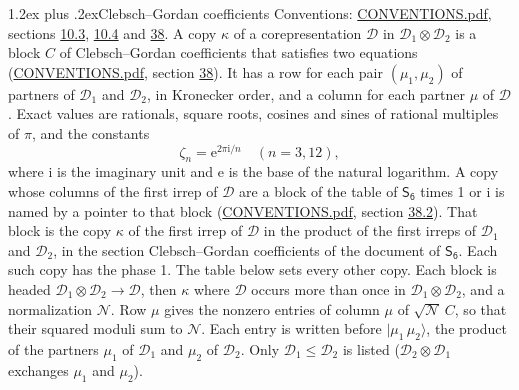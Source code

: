 \documentclass[10pt,a4paper]{article}
\makeatletter
\renewcommand\section{\@startsection{section}{1}{\z@}{-3ex plus -1ex minus -.2ex}%
  {1.2ex plus .2ex}{\normalfont\large\sffamily\bfseries\color{parttitle}}}
\numberwithin{equation}{section}
\newcommand{\grp}[1]{\mathsf{#1}}
\newcommand{\iunit}{\mathrm{i}}
\newcommand{\expe}{\mathrm{e}}
\newcommand{\rootunity}[1]{\zeta_{#1}}
\newcommand{\irrprod}{\otimes}
\newcommand{\mult}{\kappa}
\newcommand{\intx}{\mu}
\newcommand{\cgnorm}{\mathcal{N}}
\newcommand{\prodket}[2]{\lvert {#1}\,{#2}\rangle}
\makeatother
\begin{document}
\section{Clebsch--Gordan coefficients}\label{s:clebsch_gordan}
Conventions: \href{../../CONVENTIONS.pdf}{CONVENTIONS.pdf}, sections \href{../../../rotation/CONVENTIONS.pdf\#conv.10.3}{10.3}, \href{../../../rotation/CONVENTIONS.pdf\#conv.10.4}{10.4} and \href{../../CONVENTIONS.pdf\#conv.38}{38}.
\leavevmode\label{n:index.copy}\label{n:matrix.cg.stored}A copy $\mult$ of a corepresentation $\mathcal{D}$ in $\mathcal{D}_1\irrprod\mathcal{D}_2$ is a block $C$ of Clebsch--Gordan coefficients that satisfies two equations (\href{../../CONVENTIONS.pdf}{CONVENTIONS.pdf}, section \href{../../CONVENTIONS.pdf\#conv.38}{38}). \label{n:index.cg}It has a row for each pair $(\intx_1, \intx_2)$ of partners of $\mathcal{D}_1$ and $\mathcal{D}_2$, in Kronecker order, and a column for each partner $\intx$ of $\mathcal{D}$.
\leavevmode\label{n:constant.root}\label{n:index.root.order}Exact values are rationals, square roots, cosines and sines of rational multiples of $\pi$, and the constants
\begin{equation}\label{e:constants}\rootunity{n} = \expe^{2\pi\iunit/n}\quad(n = 3, 12),\end{equation}
where $\iunit$ is the imaginary unit and $\expe$ is the base of the natural logarithm.
A copy whose columns of the first irrep of $\mathcal{D}$ are a block of the table of $\grp{S_{6}}$ times 1 or $\iunit$ is named by a pointer to that block (\href{../../CONVENTIONS.pdf}{CONVENTIONS.pdf}, section \href{../../CONVENTIONS.pdf\#conv.38.2}{38.2}). That block is the copy $\mult$ of the first irrep of $\mathcal{D}$ in the product of the first irreps of $\mathcal{D}_1$ and $\mathcal{D}_2$, in the section Clebsch--Gordan coefficients of the document of \href{../../../rotation/data/pdf/S6.pdf}{$\grp{S_{6}}$}. Each such copy has the phase 1. The table below sets every other copy.
Each block is headed $\mathcal{D}_1\irrprod\mathcal{D}_2\to\mathcal{D}$, then $\mult$ where $\mathcal{D}$ occurs more than once in $\mathcal{D}_1\irrprod\mathcal{D}_2$, and a normalization $\cgnorm$. Row $\intx$ gives the nonzero entries of column $\intx$ of $\sqrt{\cgnorm}\,C$, so that their squared moduli sum to $\cgnorm$. \label{n:vector.ket.product}Each entry is written before $\prodket{\intx_1}{\intx_2}$, the product of the partners $\intx_1$ of $\mathcal{D}_1$ and $\intx_2$ of $\mathcal{D}_2$. Only $\mathcal{D}_1 \le \mathcal{D}_2$ is listed ($\mathcal{D}_2\irrprod\mathcal{D}_1$ exchanges $\intx_1$ and $\intx_2$).
\end{document}
